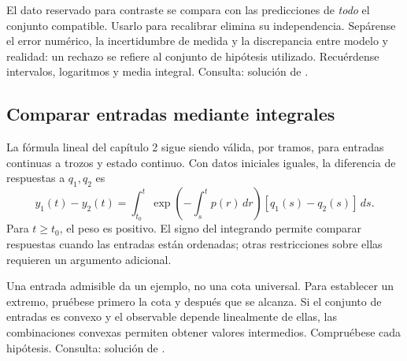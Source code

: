 El dato reservado para contraste se compara con las predicciones de
\emph{todo} el conjunto compatible. Usarlo para recalibrar elimina su
independencia. Sepárense el error numérico, la incertidumbre de medida y
la discrepancia entre modelo y realidad: un rechazo se refiere al conjunto
de hipótesis utilizado. Recuérdense intervalos, logaritmos y media integral.
Consulta: solución de .

%
\subsection*{Comparar entradas mediante integrales}
\label{CH03-B04}
La fórmula lineal del capítulo 2 sigue siendo válida, por tramos, para
entradas continuas a trozos y estado continuo. Con datos iniciales iguales,
la diferencia de respuestas a $q_1,q_2$ es
\[
 y_1(t)-y_2(t)=\int_{t_0}^{t}
 \exp\!\left(-\int_s^t p(r)\,dr\right)
 [q_1(s)-q_2(s)]\,ds.
\]
Para $t\ge t_0$, el peso es positivo. El signo del integrando permite
comparar respuestas cuando las entradas están ordenadas; otras
restricciones sobre ellas requieren un argumento adicional.

Una entrada admisible da un ejemplo, no una cota universal. Para establecer
un extremo, pruébese primero la cota y después que se alcanza. Si el
conjunto de entradas es convexo y el observable depende linealmente de
ellas, las combinaciones convexas permiten obtener valores intermedios.
Compruébese cada hipótesis. Consulta: solución de .
